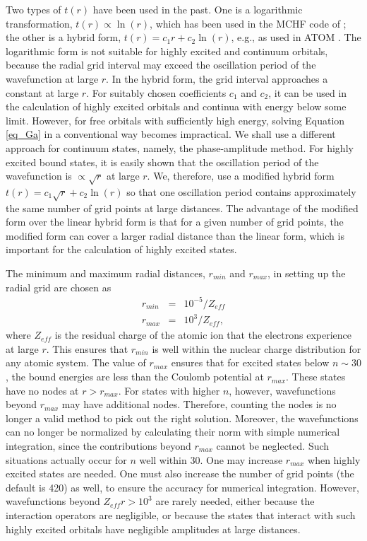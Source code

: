 \documentclass{elsart}
\begin{document}
Two types of $t(r)$ have been used in the past. One is a logarithmic
transformation, $t(r) \propto \ln(r)$, which has been used in the MCHF code of
\citet{fischer00}; the other is a hybrid form, $t(r) = c_1 r + c_2 \ln(r)$,
e.g., as used in ATOM \citep{amusia97}. The logarithmic form is not
suitable for 
highly excited and continuum orbitals, because the radial grid interval may
exceed the oscillation period of the wavefunction at large $r$. In the hybrid
form, the grid interval approaches a constant at large $r$. For suitably
chosen coefficients $c_1$ and $c_2$, it can be used in the calculation of
highly excited orbitals and continua with energy below some limit. However,
for free orbitals with sufficiently high energy, solving Equation \ref{eq_Ga}
in a conventional way becomes impractical. We shall use a different approach
for continuum states, namely, the phase-amplitude method. For highly excited
bound states, it is easily shown that the oscillation period of the
wavefunction is $\propto \sqrt{r}$ at large $r$. We, 
therefore, use a modified hybrid form $t(r) = c_1\sqrt{r} + c_2\ln(r)$ so that
one oscillation period contains approximately the same number of grid points
at large distances. The advantage of the modified form
over the linear hybrid form is that for a given number of grid points, the
modified form can cover a larger radial distance than the linear form, which is
important for the calculation of highly excited states. 

The minimum and maximum radial distances, $r_{min}$ and $r_{max}$, in setting
up the radial grid are chosen as 
\begin{eqnarray}
r_{min} &=& 10^{-5}/Z_{eff} \nonumber \\
r_{max} &=& 10^{3}/Z_{eff},
\end{eqnarray}
where $Z_{eff}$ is the residual charge of the atomic ion that the electrons
experience at large $r$. This ensures that $r_{min}$ is well within the
nuclear charge distribution for any atomic system. The value of
$r_{max}$ ensures that for excited states below $n \sim 30$, the bound energies
are less than the Coulomb potential at $r_{max}$. These states have no nodes at
$r > r_{max}$. For states with higher $n$, however, wavefunctions beyond
$r_{max}$ may have additional nodes. Therefore, counting the nodes is no
longer a valid method to pick out the right solution. Moreover, the
wavefunctions can no longer be normalized by calculating their norm with simple
numerical integration, since the contributions beyond $r_{max}$ cannot be
neglected. Such situations actually occur for $n$ well within 30. One may
increase $r_{max}$ when highly excited states are needed. One
must also increase the number of grid points (the default is 420) as well, to
ensure the accuracy for numerical integration. However, wavefunctions
beyond $Z_{eff}r > 10^{3}$ are rarely needed, either because the interaction
operators are negligible, or because the states that interact with
such highly excited orbitals have negligible amplitudes at large distances. 
\end{document}
